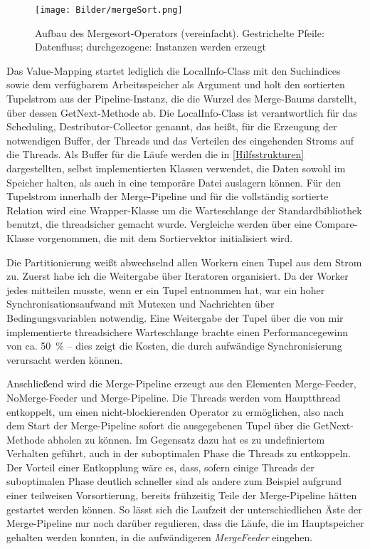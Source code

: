 \documentclass[a4paper,12pt,twoside]{article}
\newcommand{\Fb}[1]{\textit{#1}} %
\begin{document}
{\begin{figure}
	\centering
	\texttt{[image: Bilder/mergeSort.png]}
	\caption{Aufbau des Mergesort-Operators (vereinfacht). Gestrichelte Pfeile: Datenfluss; durchgezogene: Instanzen werden erzeugt}
	\label{img:KlassSort}
\end{figure}


Das Value-Mapping startet lediglich die LocalInfo-Class mit den Suchindices sowie dem verfügbarem Arbeitsspeicher als Argument und holt den sortierten Tupelstrom aus der Pipeline-Instanz, die die Wurzel des Merge-Baums darstellt, über dessen GetNext-Methode ab. Die LocalInfo-Class ist verantwortlich für das Scheduling, Destributor-Collector genannt, das heißt, für die Erzeugung der notwendigen Buffer, der Threads und das Verteilen des eingehenden Stroms auf die Threads. Als Buffer für die Läufe werden die in \autoref{Hilfsstrukturen} dargestellten, selbst implementierten Klassen verwendet, die Daten sowohl im Speicher halten, als auch in eine temporäre Datei auslagern können. Für den Tupelstrom innerhalb der Merge-Pipeline und für die vollständig sortierte Relation wird eine Wrapper-Klasse um die Warteschlange der Standardbibliothek benutzt, die threadsicher gemacht wurde. Vergleiche werden über eine Compare-Klasse vorgenommen, die mit dem Sortiervektor initialisiert wird.

Die Partitionierung weißt abwechselnd allen Workern einen Tupel aus dem Strom zu. Zuerst habe ich die Weitergabe über Iteratoren organisiert. Da der Worker jedes mitteilen musste, wenn er ein Tupel entnommen hat, war ein hoher Synchronisationsaufwand mit Mutexen und Nachrichten über Bedingungsvariablen notwendig. Eine Weitergabe der Tupel über die von mir implementierte threadsichere Warteschlange brachte einen Performancegewinn von ca. 50~\% -- dies zeigt die Kosten, die durch aufwändige Synchronisierung verursacht werden können.

Anschließend wird die Merge-Pipeline erzeugt aus den Elementen Merge-Feeder, NoMerge-Feeder und Merge-Pipeline. Die Threads werden vom Hauptthread entkoppelt, um einen nicht-blockierenden Operator zu ermöglichen, also nach dem Start der Merge-Pipeline sofort die ausgegebenen Tupel über die GetNext-Methode abholen zu können. Im Gegensatz dazu hat es zu undefiniertem Verhalten geführt, auch in der suboptimalen Phase die Threads zu entkoppeln. Der Vorteil einer Entkopplung wäre es, dass, sofern einige Threads der suboptimalen Phase deutlich schneller sind als andere zum Beispiel aufgrund einer teilweisen Vorsortierung, bereits frühzeitig Teile der Merge-Pipeline hätten gestartet werden können. So lässt sich die Laufzeit der unterschiedlichen Äste der Merge-Pipeline nur noch darüber regulieren, dass die Läufe, die im Hauptspeicher gehalten werden konnten, in die aufwändigeren \Fb{MergeFeeder} eingehen.

}
\end{document}
